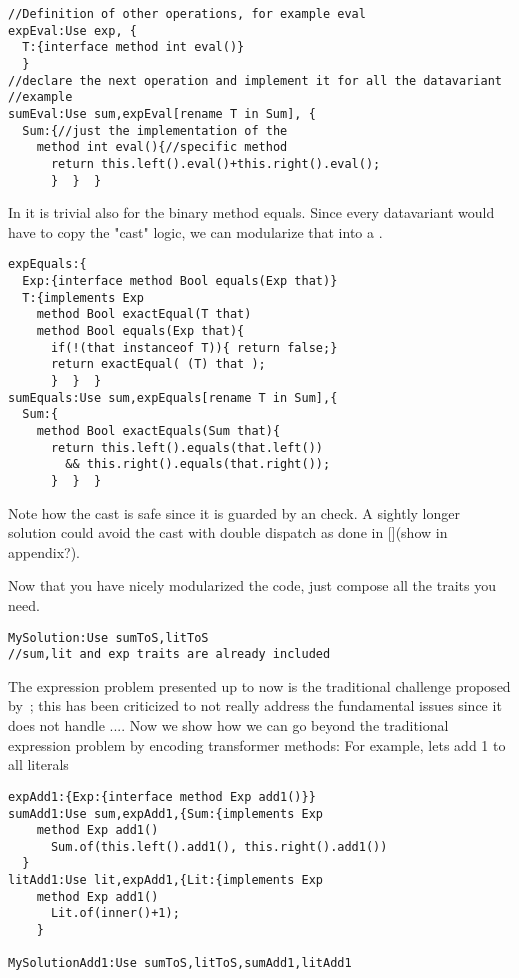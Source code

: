 \begin{lstlisting}
//Definition of other operations, for example eval
expEval:Use exp, {
  T:{interface method int eval()}
  }
//declare the next operation and implement it for all the datavariant
//example
sumEval:Use sum,expEval[rename T in Sum], {
  Sum:{//just the implementation of the
    method int eval(){//specific method
      return this.left().eval()+this.right().eval();
      }  }  }
\end{lstlisting}
In \name it is trivial also for the binary method equals.
Since every datavariant would have to copy the "cast" logic,
 we can modularize that into a \Q@expEquals@.

\begin{lstlisting}
expEquals:{
  Exp:{interface method Bool equals(Exp that)}
  T:{implements Exp
    method Bool exactEqual(T that)
    method Bool equals(Exp that){
      if(!(that instanceof T)){ return false;}
      return exactEqual( (T) that );
      }  }  }
sumEquals:Use sum,expEquals[rename T in Sum],{
  Sum:{
    method Bool exactEquals(Sum that){
      return this.left().equals(that.left()) 
        && this.right().equals(that.right());
      }  }  }
\end{lstlisting}
Note how the cast is safe since it is guarded by
an \Q@instanceof@ check. A sightly longer solution could avoid the
cast with double dispatch as done in [](show in appendix?).

Now that you have nicely modularized the code, just compose all the traits you need.
\begin{lstlisting}
MySolution:Use sumToS,litToS
//sum,lit and exp traits are already included
\end{lstlisting}

The expression problem presented up to now is the traditional challenge proposed by~\cite{wadler1998expression};
this has been criticized to not really address the fundamental issues since it does not handle ....
Now we show how we can go beyond the traditional expression problem by encoding transformer methods:
For example, lets add 1 to all literals
\begin{lstlisting}
expAdd1:{Exp:{interface method Exp add1()}}
sumAdd1:Use sum,expAdd1,{Sum:{implements Exp
    method Exp add1()
      Sum.of(this.left().add1(), this.right().add1())
  }
litAdd1:Use lit,expAdd1,{Lit:{implements Exp
    method Exp add1()
      Lit.of(inner()+1);
    }

MySolutionAdd1:Use sumToS,litToS,sumAdd1,litAdd1
\end{lstlisting}

